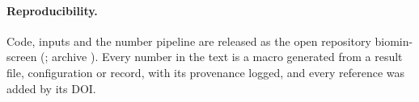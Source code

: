 \paragraph*{Reproducibility.}
Code, inputs and the number pipeline are released as the open repository biomin-screen (\nacreRepoURL; archive \nacreZenodoDOI). %
Every number in the text is a macro generated from a result file, configuration or record, with its provenance logged, and every reference was added by its DOI. %
